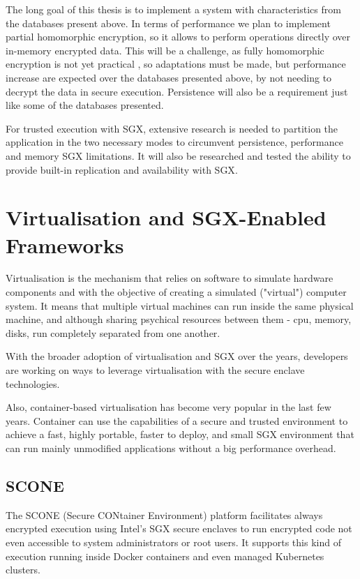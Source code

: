 The long goal of this thesis is to implement a system with characteristics from the databases present above. In terms of performance we plan to implement partial homomorphic encryption, so it allows to perform operations directly over in-memory encrypted data. This will be a challenge, as fully homomorphic encryption is not yet practical \cite{homomorphic:1}, so adaptations must be made, but performance increase are expected  over the databases presented above, by not needing to decrypt the data in secure execution. Persistence will also be a requirement just like some of the databases presented.

For trusted execution with \gls{SGX}, extensive research is needed to partition the application in the two necessary modes to circumvent persistence, performance and memory \gls{SGX} limitations. It will also be researched and tested the ability to provide built-in replication and availability with \gls{SGX}.

\section{Virtualisation and SGX-Enabled Frameworks}
\label{sec:virtualization_and_sgx_enabled_frameworks}

Virtualisation is the mechanism that relies on software to simulate hardware components and with the objective of creating a simulated ("virtual") computer system. It means that multiple virtual machines can run inside the same physical machine, and although sharing psychical resources between them - cpu, memory, disks, run completely separated from one another.

With the broader adoption of virtualisation and \gls{SGX} over the years, developers are working on ways to leverage virtualisation with the secure enclave technologies.

Also, container-based virtualisation has become very popular in the last few years. Container can use the capabilities of a secure and trusted environment to achieve a fast, highly portable, faster to deploy, and small \gls{SGX} environment that can run mainly unmodified applications without a big performance overhead.

\subsection{SCONE}
\label{ssec:scone}

The SCONE \cite{scone:1} (Secure CONtainer Environment) platform facilitates always encrypted execution using Intel's \gls{SGX} secure enclaves to run encrypted code not even accessible to system administrators or root users. It supports this kind of execution running inside Docker containers and even managed Kubernetes clusters.

